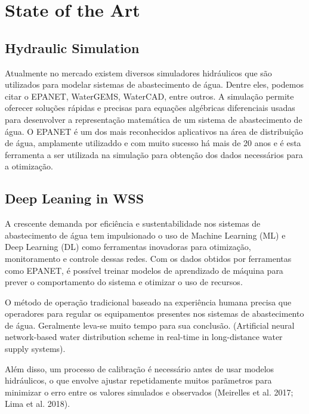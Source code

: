 \chapter{State of the Art}%
\label{chapter:state-of-the-art}



\section{Hydraulic Simulation}

Atualmente no mercado existem diversos simuladores hidráulicos que são utilizados para modelar sistemas de abastecimento de água. Dentre eles, podemos citar o EPANET, WaterGEMS, WaterCAD, entre outros. A simulação permite oferecer soluções rápidas e precisas para equações algébricas diferenciais usadas para desenvolver a representação matemática de um sistema de abastecimento de água\cite{rfc1}. O EPANET é um dos mais reconhecidos aplicativos na área de distribuição de água\cite{rfc4}, amplamente utilizaddo e com muito sucesso\cite{rfc5} há mais de 20 anos\cite{rfc6} e é esta ferramenta a ser utilizada na simulação para obtenção dos dados necessários para a otimização.


\section{Deep Leaning in WSS}

A crescente demanda por eficiência e sustentabilidade nos sistemas de abastecimento de água tem impulsionado o uso de Machine Learning (ML) e Deep Learning (DL) como ferramentas inovadoras para otimização, monitoramento e controle dessas redes. Com os dados obtidos por ferramentas como EPANET, é possível treinar modelos de aprendizado de máquina para prever o comportamento do sistema e otimizar o uso de recursos.




O método de operação tradicional baseado na experiência humana precisa que operadores para regular os equipamentos presentes nos sistemas de abastecimento de água. Geralmente leva-se muito tempo para sua conclusão.  (Artificial neural network-based water distribution scheme in real-time in long-distance water supply systems).

Além disso, um processo de calibração é necessário antes de usar modelos hidráulicos, o que envolve ajustar repetidamente muitos parãmetros para minimizar o erro entre os valores simulados e observados (Meirelles et al. 2017; Lima et al. 2018).

